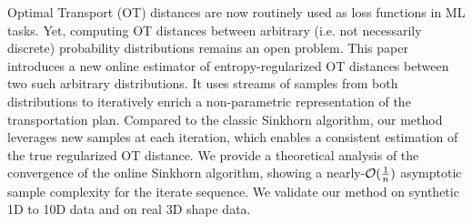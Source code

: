 Optimal Transport (OT) distances are now routinely used as loss functions in ML tasks. Yet, computing OT distances between arbitrary (i.e. not necessarily discrete) probability distributions remains an open problem. This paper introduces a new online estimator of entropy-regularized OT distances between two such arbitrary distributions. It uses streams of samples from both distributions to iteratively enrich a non-parametric representation of the transportation plan. Compared to the classic Sinkhorn algorithm, our method leverages new samples at each iteration, which enables a consistent estimation of the true regularized OT distance. We provide a theoretical analysis of the convergence of the online Sinkhorn algorithm, showing a nearly-$\mathcal{O}(\frac{1}{n})$ asymptotic sample complexity for the iterate sequence. We validate our method on synthetic 1D to 10D data and on real 3D shape data.